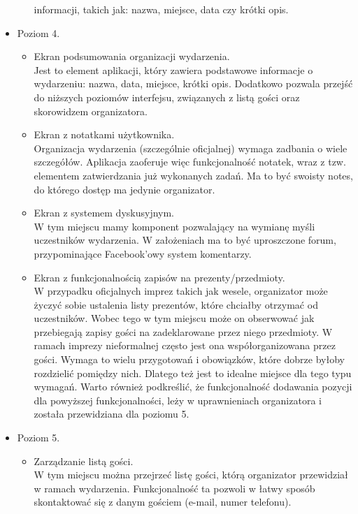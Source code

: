 \documentclass[12pt,titlepage]{article}
\begin{document}
\begin{itemize}
\begin{itemize}
       informacji, takich jak: nazwa, miejsce, data czy krótki opis.
      \end{itemize}
 \item Poziom 4.
      \begin{itemize}
       \item Ekran podsumowania organizacji wydarzenia.
       \\Jest to element aplikacji, który zawiera podstawowe informacje o wydarzeniu: nazwa, data, miejsce, krótki opis. Dodatkowo pozwala przejść do niższych poziomów interfejsu,
       związanych z listą gości oraz skorowidzem organizatora.
       \item Ekran z notatkami użytkownika.
       \\Organizacja wydarzenia (szczególnie oficjalnej) wymaga zadbania o wiele szczegółów. Aplikacja zaoferuje więc funkcjonalność notatek, wraz z tzw. elementem
       zatwierdzania już wykonanych zadań. Ma to być swoisty notes, do którego dostęp ma jedynie organizator.
       \item Ekran z systemem dyskusyjnym.
       \\W tym miejscu mamy komponent pozwalający na wymianę myśli uczestników wydarzenia. W założeniach ma to być uproszczone forum, przypominające Facebook'owy system komentarzy.
       \item Ekran z funkcjonalnością zapisów na prezenty/przedmioty.
       \\W przypadku oficjalnych imprez takich jak wesele, organizator może życzyć sobie ustalenia listy prezentów, które chciałby otrzymać od uczestników. Wobec tego w tym miejscu
       może on obserwować jak przebiegają zapisy gości na zadeklarowane przez niego przedmioty.
       W ramach imprezy nieformalnej często jest ona współorganizowana przez gości. Wymaga to wielu przygotowań i obowiązków, które dobrze byłoby rozdzielić pomiędzy nich. 
       Dlatego też jest to idealne miejsce dla tego typu wymagań.
       Warto również podkreślić, że funkcjonalność dodawania pozycji dla powyższej funkcjonalności, leży w uprawnieniach organizatora i została przewidziana dla poziomu 5.
      \end{itemize}
 \item Poziom 5.
      \begin{itemize}
	\item Zarządzanie listą gości.
	\\W tym miejscu można przejrzeć listę gości, którą organizator przewidział w ramach wydarzenia. Funkcjonalność ta pozwoli w łatwy sposób skontaktować się z danym gościem (e-mail, numer telefonu).

\end{itemize}
\end{itemize}
\end{document}
